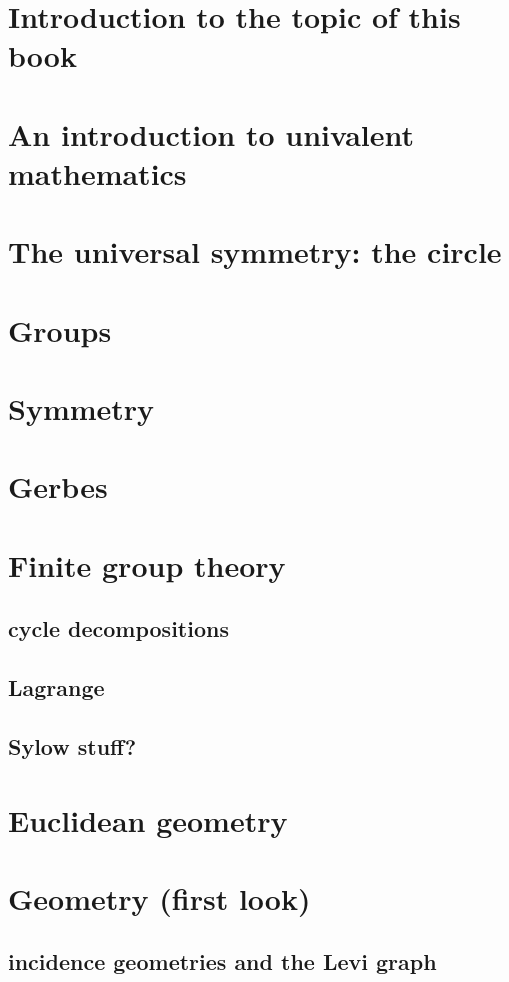 \documentclass[a4,12pt]{amsbook}
\begin{document}

\chapter{Introduction to the topic of this book}

\chapter{An introduction to univalent mathematics}

\chapter{The universal symmetry: the circle}

\chapter{Groups}

\chapter{Symmetry}

\chapter{Gerbes}

\chapter{Finite group theory}

\section{cycle decompositions}
\section{Lagrange}
\section{Sylow stuff?}

\chapter{Euclidean geometry}


\chapter{Geometry (first look)}
\section{incidence geometries and the Levi graph}
\end{document}
